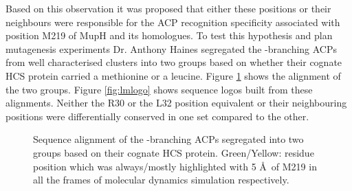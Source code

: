 	Based on this observation it was proposed that either these positions or their neighbours were responsible for the ACP recognition specificity associated with position M219 of MupH and its homologues. To test this hypothesis and plan mutagenesis experiments Dr. Anthony Haines segregated the \bet-branching ACPs from well characterised clusters into two groups based on whether their cognate HCS protein carried a methionine or a leucine. Figure \ref{fig:lmalignment} shows the alignment of the two groups. Figure \ref{fig:lmlogo} shows sequence logos built from these alignments. Neither the R30 or the  L32 position equivalent or their neighbouring positions were differentially conserved in one set compared to the other.

		\setlength\fboxsep{5pt}
		\setlength\fboxrule{1.5pt}
		\begin{figure}[htbp]
		\centering
		\caption[Sequence alignment of the \bet-branching ACPs segregated into two groups based on their cognate HCS protein.]{Sequence alignment of the \bet-branching ACPs segregated into two groups based on their cognate HCS protein. Green/Yellow: residue position which was always/mostly highlighted with 5 \AA \ of M219 in all the frames of molecular dynamics simulation respectively.}
		\label{fig:lmalignment}
		\end{figure}		

